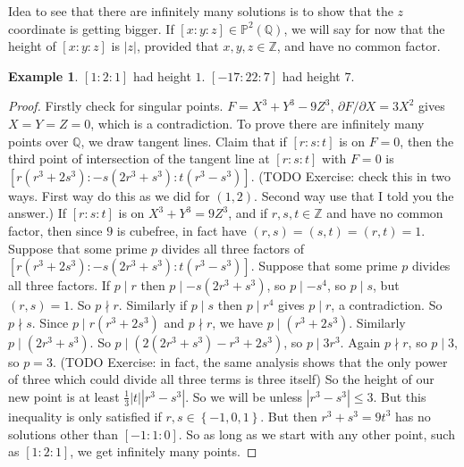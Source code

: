\documentclass{article}
\newcommand{\Z}{\mathbb{Z}}
\newcommand{\Q}{\mathbb{Q}}
\renewcommand{\P}{\mathbb{P}}
\newcommand{\rb}[1]{\left( #1 \right)}
\renewcommand{\sb}[1]{\left[ #1 \right]}
\newcommand{\cb}[1]{\left\{ #1 \right\}}
\newcommand{\abs}[1]{\left\lvert #1 \right\rvert}
\theoremstyle{definition}\newtheorem{definition}{Definition}[section]
\theoremstyle{definition}\newtheorem{remark}[definition]{Remark}
\theoremstyle{definition}\newtheorem*{example}{Example}
\theoremstyle{definition}\newtheorem*{note}{Note}
\begin{document}
Idea to see that there are infinitely many solutions is to show that the $ z $ coordinate is getting bigger. If $ \sb{x : y : z} \in \P^2\rb{\Q} $, we will say for now that the height of $ \sb{x : y : z} $ is $ \abs{z} $, provided that $ x, y, z \in \Z $, and have no common factor.

\begin{example}
$ \sb{1 : 2 : 1} $ had height $ 1 $. $ \sb{-17 : 22 : 7} $ had height $ 7 $.
\end{example}

\begin{proof}
Firstly check for singular points. $ F = X^3 + Y^3 - 9Z^3 $, $ \partial F / \partial X = 3X^2 $ gives $ X = Y = Z = 0 $, which is a contradiction. To prove there are infinitely many points over $ \Q $, we draw tangent lines. Claim that if $ \sb{r : s : t} $ is on $ F = 0 $, then the third point of intersection of the tangent line at $ \sb{r : s : t} $ with $ F = 0 $ is $ \sb{r\rb{r^3 + 2s^3} : -s\rb{2r^3 + s^3} : t\rb{r^3 - s^3}} $. (TODO Exercise: check this in two ways. First way do this as we did for $ \rb{1, 2} $. Second way use that I told you the answer.) If $ \sb{r : s : t} $ is on $ X^3 + Y^3 = 9Z^3 $, and if $ r, s, t \in \Z $ and have no common factor, then since $ 9 $ is cubefree, in fact have $ \rb{r, s} = \rb{s, t} = \rb{r, t} = 1 $. Suppose that some prime $ p $ divides all three factors of $ \sb{r\rb{r^3 + 2s^3} : -s\rb{2r^3 + s^3} : t\rb{r^3 - s^3}} $. Suppose that some prime $ p $ divides all three factors. If $ p \mid r $ then $ p \mid -s\rb{2r^3 + s^3} $, so $ p \mid -s^4 $, so $ p \mid s $, but $ \rb{r, s} = 1 $. So $ p \nmid r $. Similarly if $ p \mid s $ then $ p \mid r^4 $ gives $ p \mid r $, a contradiction. So $ p \nmid s $. Since $ p \mid r\rb{r^3 + 2s^3} $ and $ p \nmid r $, we have $ p \mid \rb{r^3 + 2s^3} $. Similarly $ p \mid \rb{2r^3 + s^3} $. So $ p \mid \rb{2\rb{2r^3 + s^3} - r^3 + 2s^3} $, so $ p \mid 3r^3 $. Again $ p \nmid r $, so $ p \mid 3 $, so $ p = 3 $. (TODO Exercise: in fact, the same analysis shows that the only power of three which could divide all three terms is three itself) So the height of our new point is at least $ \tfrac{1}{3}\abs{t}\abs{r^3 - s^3} $. So we will be unless $ \abs{r^3 - s^3} \le 3 $. But this inequality is only satisfied if $ r, s \in \cb{-1, 0, 1} $. But then $ r^3 + s^3 = 9t^3 $ has no solutions other than $ \sb{-1 : 1 : 0} $. So as long as we start with any other point, such as $ \sb{1 : 2 : 1} $, we get infinitely many points.
\end{proof}
\end{document}
